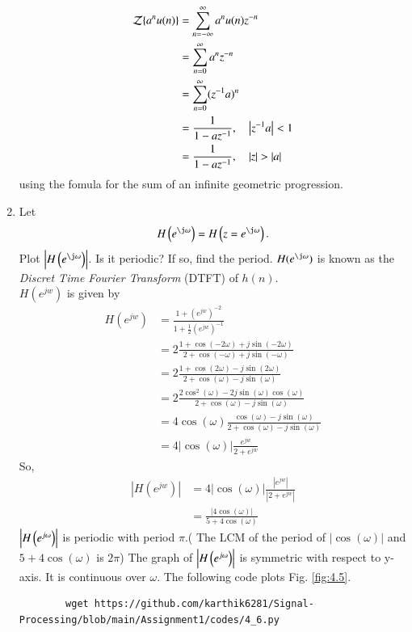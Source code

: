 \documentclass[journal,12pt,twocolumn]{IEEEtran}
\renewcommand\thesection{\arabic{section}}
\begin{document}
\begin{enumerate}[label=\thesection.\arabic*]
\begin{equation}
	\end{equation}
	\solution
	\begin{align}
		{\mathcal {Z}}\{a^nu(n)\}&=\sum _{n=-\infty }^{\infty }a^nu(n)z^{-n}\\
		&=\sum _{n=0 }^{\infty }a^nz^{-n}\\
		&=\sum _{n=0 }^{\infty }(z^{-1}a)^{n}\\
		&=\frac{1}{1-az^{-1}}, \quad \left\vert z^{-1}a\right\vert < 1\\
		&=\frac{1}{1-az^{-1}}, \quad \left\vert z\right\vert > \left\vert a\right\vert 
	\end{align}
	using the fomula for the sum of an infinite geometric progression.
	\item 
	Let
	\begin{equation}
		H\brak{e^{\j \omega}} = H\brak{z = e^{\j \omega}}.
	\end{equation}
	Plot $\abs{H\brak{e^{\j \omega}}}$.  Is it periodic? If so, find the period.  $H(e^{\j \omega})$ is
	known as the {\em Discret Time Fourier Transform} (DTFT) of $h(n)$.
	\\
	\solution $H(e^{jw})$ is given by
	\begin{align}
		H(e^{jw})&=\frac{1+(e^{jw})^{-2}}{1+\frac{1}{2}(e^{jw})^{-1}}\\
		&=2\frac{1+\cos(-2\omega)+j\sin(-2\omega)}{2+\cos(-\omega)+j\sin(-\omega)}\\
		&=2\frac{1+\cos(2\omega)-j\sin(2\omega)}{2+\cos(\omega)-j\sin(\omega)}\\
		&=2\frac{2\cos^2(\omega)-2j\sin(\omega)\cos(\omega)}{2+\cos(\omega)-j\sin(\omega)}\\
		&=4\cos(\omega)\frac{\cos(\omega)-j\sin(\omega)}{2+\cos(\omega)-j\sin(\omega)}\\
		&=4|\cos(\omega)| \frac{e^{jw}}{2+e^{jw}}
	\end{align}
	So,
	\begin{align}
		|H(e^{jw})|&=4 |\cos(\omega)| \frac{|e^{jw}|}{|2+e^{jw}|}\\
		&=\frac{|4\cos(\omega)|}{5+4\cos(\omega)}
	\end{align}
	 $\left\vert H\left(e^{j\omega}\right)\right\vert$ is periodic with period $\pi$.( The LCM of the period of $|\cos(\omega)|$ and $5+4\cos(\omega)$ is $2\pi$)
	The graph of $\left\vert H\left(e^{j\omega}\right)\right\vert$ is symmetric with respect to y-axis. It is continuous over $\omega$. The following code plots Fig. \ref{fig:4.5}.
	\begin{lstlisting}
		wget https://github.com/karthik6281/Signal-Processing/blob/main/Assignment1/codes/4_6.py
	\end{lstlisting}

\end{enumerate}
\end{document}
